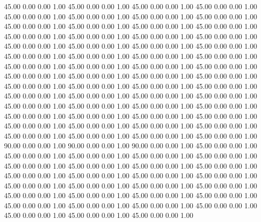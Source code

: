    45.00   0.00   0.00   1.00
   45.00   0.00   0.00   1.00
   45.00   0.00   0.00   1.00
   45.00   0.00   0.00   1.00
   45.00   0.00   0.00   1.00
   45.00   0.00   0.00   1.00
   45.00   0.00   0.00   1.00
   45.00   0.00   0.00   1.00
   45.00   0.00   0.00   1.00
   45.00   0.00   0.00   1.00
   45.00   0.00   0.00   1.00
   45.00   0.00   0.00   1.00
   45.00   0.00   0.00   1.00
   45.00   0.00   0.00   1.00
   45.00   0.00   0.00   1.00
   45.00   0.00   0.00   1.00
   45.00   0.00   0.00   1.00
   45.00   0.00   0.00   1.00
   45.00   0.00   0.00   1.00
   45.00   0.00   0.00   1.00
   45.00   0.00   0.00   1.00
   45.00   0.00   0.00   1.00
   45.00   0.00   0.00   1.00
   45.00   0.00   0.00   1.00
   45.00   0.00   0.00   1.00
   45.00   0.00   0.00   1.00
   45.00   0.00   0.00   1.00
   45.00   0.00   0.00   1.00
   45.00   0.00   0.00   1.00
   45.00   0.00   0.00   1.00
   45.00   0.00   0.00   1.00
   45.00   0.00   0.00   1.00
   45.00   0.00   0.00   1.00
   45.00   0.00   0.00   1.00
   45.00   0.00   0.00   1.00
   45.00   0.00   0.00   1.00
   45.00   0.00   0.00   1.00
   45.00   0.00   0.00   1.00
   45.00   0.00   0.00   1.00
   45.00   0.00   0.00   1.00
   45.00   0.00   0.00   1.00
   45.00   0.00   0.00   1.00
   45.00   0.00   0.00   1.00
   45.00   0.00   0.00   1.00
   45.00   0.00   0.00   1.00
   45.00   0.00   0.00   1.00
   45.00   0.00   0.00   1.00
   45.00   0.00   0.00   1.00
   45.00   0.00   0.00   1.00
   45.00   0.00   0.00   1.00
   45.00   0.00   0.00   1.00
   45.00   0.00   0.00   1.00
   45.00   0.00   0.00   1.00
   45.00   0.00   0.00   1.00
   45.00   0.00   0.00   1.00
   45.00   0.00   0.00   1.00
   90.00   0.00   0.00   1.00
   90.00   0.00   0.00   1.00
   90.00   0.00   0.00   1.00
   45.00   0.00   0.00   1.00
   45.00   0.00   0.00   1.00
   45.00   0.00   0.00   1.00
   45.00   0.00   0.00   1.00
   45.00   0.00   0.00   1.00
   45.00   0.00   0.00   1.00
   45.00   0.00   0.00   1.00
   45.00   0.00   0.00   1.00
   45.00   0.00   0.00   1.00
   45.00   0.00   0.00   1.00
   45.00   0.00   0.00   1.00
   45.00   0.00   0.00   1.00
   45.00   0.00   0.00   1.00
   45.00   0.00   0.00   1.00
   45.00   0.00   0.00   1.00
   45.00   0.00   0.00   1.00
   45.00   0.00   0.00   1.00
   45.00   0.00   0.00   1.00
   45.00   0.00   0.00   1.00
   45.00   0.00   0.00   1.00
   45.00   0.00   0.00   1.00
   45.00   0.00   0.00   1.00
   45.00   0.00   0.00   1.00
   45.00   0.00   0.00   1.00
   45.00   0.00   0.00   1.00
   45.00   0.00   0.00   1.00
   45.00   0.00   0.00   1.00
   45.00   0.00   0.00   1.00

